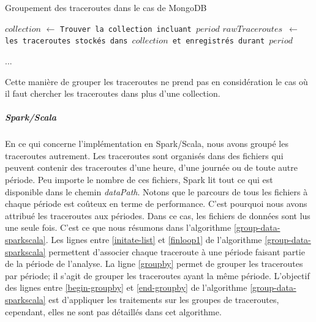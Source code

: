 \begin{algorithm}[H]
	\caption{Groupement des traceroutes dans le cas de MongoDB}
	\label{group-traceroutesmongodb}
	\begin{algorithmic}
		
		\State $collection$ $\gets$ \texttt{Trouver la collection incluant $period$}
		\State \texttt{$rawTraceroutes$ $\gets$   les traceroutes stockés dans  $collection$ et enregistrés durant $period$}
		
     ...	
		\EndFor
	\end{algorithmic}
\end{algorithm}

Cette manière de grouper les traceroutes ne prend pas en considération le cas où
il faut chercher les traceroutes dans plus d'une collection.

\subparagraph{Spark/Scala} En ce qui concerne l'implémentation en Spark/Scala,
 nous avons groupé les traceroutes autrement. 
 Les traceroutes sont organisés dans des fichiers qui peuvent contenir des traceroutes d'une heure, d'une journée ou de toute autre période.  Peu importe le nombre de ces fichiers, Spark lit tout ce qui est disponible dans le chemin \textit{dataPath}. 
 Notons que le  parcours de tous les fichiers à chaque  période est coûteux en terme de performance.
  C'est pourquoi nous avons attribué les traceroutes aux périodes. Dans ce cas, les fichiers de données sont lus une seule fois. C'est ce que nous résumons dans l'algorithme \ref{group-data-sparkscala}. Les lignes entre \ref{initate-list} et \ref{finloop1} de l'algorithme \ref{group-data-sparkscala} permettent d'associer chaque traceroute à une période faisant partie de la période de l'analyse. La ligne  \ref{groupby} permet de grouper les traceroutes par période; il s'agit de grouper les traceroutes ayant la même période. L'objectif des lignes entre \ref{begin-groupby} et \ref{end-groupby}  de l'algorithme \ref{group-data-sparkscala} est d'appliquer les traitements sur les groupes de traceroutes, cependant, elles ne sont pas détaillés dans cet algorithme. 
  

